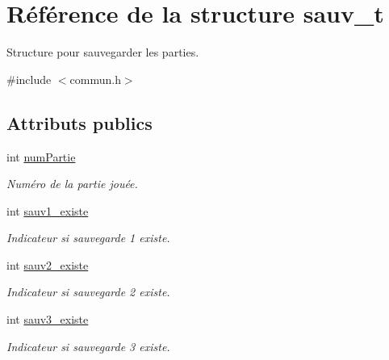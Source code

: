\hypertarget{structsauv__t}{}\section{Référence de la structure sauv\+\_\+t}
\label{structsauv__t}


Structure pour sauvegarder les parties.  




{\ttfamily \#include $<$commun.\+h$>$}

\subsection*{Attributs publics}
\begin{DoxyCompactItemize}
\item 
\mbox{\label{structsauv__t_a2bffc3d4e5e04b371f01ac422195a149}} 
int \hyperlink{structsauv__t_a2bffc3d4e5e04b371f01ac422195a149}{num\+Partie}
\begin{DoxyCompactList}\small\item\em Numéro de la partie jouée. \end{DoxyCompactList}\item 
\mbox{\label{structsauv__t_a8f0d6ce1c530feffc7cd6c23f244a077}} 
int \hyperlink{structsauv__t_a8f0d6ce1c530feffc7cd6c23f244a077}{sauv1\+\_\+existe}
\begin{DoxyCompactList}\small\item\em Indicateur si sauvegarde 1 existe. \end{DoxyCompactList}\item 
\mbox{\label{structsauv__t_a2c084dabee42d6fc7ebe57fcdd77de1a}} 
int \hyperlink{structsauv__t_a2c084dabee42d6fc7ebe57fcdd77de1a}{sauv2\+\_\+existe}
\begin{DoxyCompactList}\small\item\em Indicateur si sauvegarde 2 existe. \end{DoxyCompactList}\item 
\mbox{\label{structsauv__t_a39720a5959a8c54f8a6474e9fcbf0c05}} 
int \hyperlink{structsauv__t_a39720a5959a8c54f8a6474e9fcbf0c05}{sauv3\+\_\+existe}
\begin{DoxyCompactList}\small\item\em Indicateur si sauvegarde 3 existe. \end{DoxyCompactList}\item 

\end{DoxyCompactItemize}
